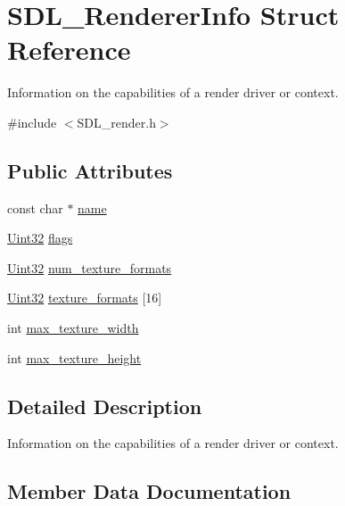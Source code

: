 \hypertarget{struct_s_d_l___renderer_info}{}\section{S\+D\+L\+\_\+\+Renderer\+Info Struct Reference}
\label{struct_s_d_l___renderer_info}


Information on the capabilities of a render driver or context.  




{\ttfamily \#include $<$S\+D\+L\+\_\+render.\+h$>$}

\subsection*{Public Attributes}
\begin{DoxyCompactItemize}
\item 
const char $\ast$ \mbox{\hyperlink{struct_s_d_l___renderer_info_a433ecb2865c81ba9f28038e56a4ae6f3}{name}}
\item 
\mbox{\hyperlink{_s_d_l__stdinc_8h_add440eff171ea5f55cb00c4a9ab8672d}{Uint32}} \mbox{\hyperlink{struct_s_d_l___renderer_info_a95cf0ffd1704fd0a4dd8ceac6c9f0542}{flags}}
\item 
\mbox{\hyperlink{_s_d_l__stdinc_8h_add440eff171ea5f55cb00c4a9ab8672d}{Uint32}} \mbox{\hyperlink{struct_s_d_l___renderer_info_acdec165b2053b914313f5996983ec6b8}{num\+\_\+texture\+\_\+formats}}
\item 
\mbox{\hyperlink{_s_d_l__stdinc_8h_add440eff171ea5f55cb00c4a9ab8672d}{Uint32}} \mbox{\hyperlink{struct_s_d_l___renderer_info_a88450f9d48e593ec4571e3ba7cc3427d}{texture\+\_\+formats}} \mbox{[}16\mbox{]}
\item 
int \mbox{\hyperlink{struct_s_d_l___renderer_info_a6e6757e3d5c1f0922adaba39380edfa6}{max\+\_\+texture\+\_\+width}}
\item 
int \mbox{\hyperlink{struct_s_d_l___renderer_info_a87c6a13e8d535c2148f8913c05e13102}{max\+\_\+texture\+\_\+height}}
\end{DoxyCompactItemize}


\subsection{Detailed Description}
Information on the capabilities of a render driver or context. 

\subsection{Member Data Documentation}
\mbox{\label{struct_s_d_l___renderer_info_a95cf0ffd1704fd0a4dd8ceac6c9f0542}} 
